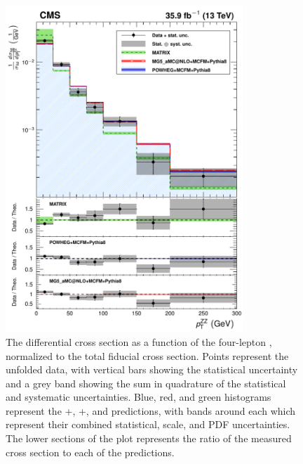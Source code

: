 \begin{figure}[htbp]
  \begin{center}
    \includegraphics[width=0.8\textwidth]{results/unfold_pt.pdf}
    \caption[Normalized differential {\ZZ} cross section as a function of four-lepton system {\pt}]{
        The {\ZZ} differential cross section as a function of the four-lepton {\pt}, normalized to the total fiducial cross section.
        Points represent the unfolded data, with vertical bars showing the statistical uncertainty and a grey band showing the sum in quadrature of the statistical and systematic uncertainties.
        Blue, red, and green histograms represent the {\POWHEG}+{\MCFM}, {\MGAMC}+{\MCFM}, and {\MATRIX} predictions, with bands around each which represent their combined statistical, scale, and PDF uncertainties.
        The lower sections of the plot represents the ratio of the measured cross section to each of the predictions.
      }\label{fig:unfold_pt}
  \end{center}
\end{figure}

